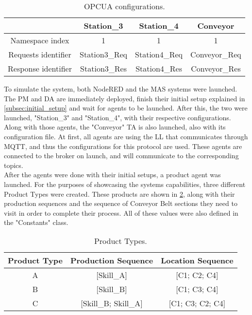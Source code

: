 \begin{table}[h!]
	\centering
	\caption{\acrshort{OPCUA} configurations.}
	\begin{tabular}{c|c|c|c|}
		\cline{2-4}
		& Station\_3    & Station\_4    & Conveyor      \\ \hline
		\multicolumn{1}{|c|}{Namespace index}     & 1             & 1             & 1             \\ \hline
		\multicolumn{1}{|c|}{Requests identifier} & Station3\_Req & Station4\_Req & Conveyor\_Req \\ \hline
		\multicolumn{1}{|c|}{Response identifier} & Station3\_Res & Station4\_Res & Conveyor\_Res \\ \hline
	\end{tabular}
	\label{tab:opcua_config}
\end{table}

To simulate the system, both NodeRED and the \acrshort{MAS} systems were launched. The \acrlong{PM} and \acrlong{DA} are immediately deployed, finish their initial setup explained in \ref{subsec:initial_setup} and wait for agents to be launched. After this, the two  were launched, "Station\_3" and "Station\_4", with their respective configurations. Along with those agents, the "Conveyor" \acrlong{TA} is also launched, also with its configuration file. At first, all agents are using the \acrshort{LL} that communicates through \acrshort{MQTT}, and thus the configurations for this protocol are used. These agents are connected to the broker on launch, and will communicate to the corresponding topics.\\

After the agents were done with their initial setups, a product agent was launched. For the purposes of showcasing the systems capabilities, three different Product Types were created. These products are shown in \ref{tab:product_types}, along with their production sequences and the sequence of Conveyor Belt sections they need to visit in order to complete their process. All of these values were also defined in the "Constants" class.

\begin{table}[h!]
	\caption{Product Types.}
	\centering
	\begin{tabular}{|c|c|c|}
		\hline
		Product Type & Production Sequence      & Location Sequence    \\ \hline
		A            & {[}Skill\_A{]}           & {[}C1; C2; C4{]}     \\ \hline
		B            & {[}Skill\_B{]}           & {[}C1; C3; C4{]}     \\ \hline
		C            & {[}Skill\_B; Skill\_A{]} & {[}C1; C3; C2; C4{]} \\ \hline
	\end{tabular}
	\label{tab:product_types}
\end{table}

